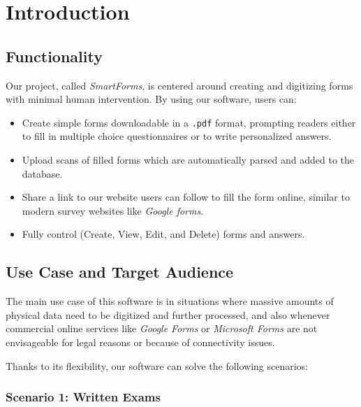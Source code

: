 \documentclass[11pt, a4paper]{report}
\def\code#1{\texttt{#1}}
\begin{document}
\tableofcontents

\cleardoublepage
\pagestyle{main}
\let\ps@plain\ps@main


\chapter{Introduction}

\section{Functionality}

Our project, called \textit{SmartForms}, is centered around creating and digitizing forms with minimal human intervention. By using our software, users can:
\begin{itemize}
    \item Create simple forms downloadable in a \code{.pdf} format, prompting readers either to fill in multiple choice questionnaires or to write personalized answers.
    \item Upload scans of filled forms which are automatically parsed and added to the database.
    \item Share a link to our website users can follow to fill the form online, similar to modern survey websites like \textit{Google forms}.
    \item Fully control (Create, View, Edit, and Delete) forms and answers.
\end{itemize}

\section{Use Case and Target Audience}

The main use case of this software is in situations where massive amounts of physical data need to be digitized and further processed, and also whenever commercial online services like \textit{Google Forms} or \textit{Microsoft Forms} are not envisageable for legal reasons or because of connectivity issues.

Thanks to its flexibility, our software can solve the following scenarios:

\subsection*{Scenario 1: Written Exams}
\end{document}

